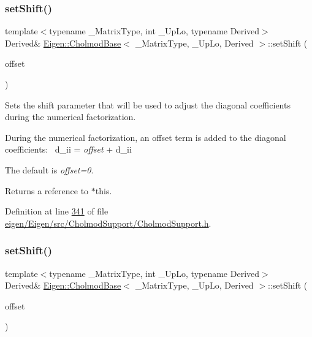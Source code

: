 \subsubsection{\texorpdfstring{set\+Shift()}{setShift()}\hspace{0.1cm}{\footnotesize\ttfamily [1/2]}}
{\footnotesize\ttfamily template$<$typename \+\_\+\+Matrix\+Type, int \+\_\+\+Up\+Lo, typename Derived$>$ \\
Derived\& \hyperlink{class_eigen_1_1_cholmod_base}{Eigen\+::\+Cholmod\+Base}$<$ \+\_\+\+Matrix\+Type, \+\_\+\+Up\+Lo, Derived $>$\+::set\+Shift (\begin{DoxyParamCaption}\item[{const Real\+Scalar \&}]{offset }\end{DoxyParamCaption})\hspace{0.3cm}{\ttfamily [inline]}}

Sets the shift parameter that will be used to adjust the diagonal coefficients during the numerical factorization.

During the numerical factorization, an offset term is added to the diagonal coefficients\+:~\newline
{\ttfamily d\+\_\+ii} = {\itshape offset} + {\ttfamily d\+\_\+ii} 

The default is {\itshape offset=0}.

\begin{DoxyReturn}{Returns}
a reference to {\ttfamily $\ast$this}. 
\end{DoxyReturn}


Definition at line \hyperlink{eigen_2_eigen_2src_2_cholmod_support_2_cholmod_support_8h_source_l00341}{341} of file \hyperlink{eigen_2_eigen_2src_2_cholmod_support_2_cholmod_support_8h_source}{eigen/\+Eigen/src/\+Cholmod\+Support/\+Cholmod\+Support.\+h}.

\mbox{\label{class_eigen_1_1_cholmod_base_a886fc102723ca7bde4ac7162dfd72f5d}} 
\subsubsection{\texorpdfstring{set\+Shift()}{setShift()}\hspace{0.1cm}{\footnotesize\ttfamily [2/2]}}
{\footnotesize\ttfamily template$<$typename \+\_\+\+Matrix\+Type, int \+\_\+\+Up\+Lo, typename Derived$>$ \\
Derived\& \hyperlink{class_eigen_1_1_cholmod_base}{Eigen\+::\+Cholmod\+Base}$<$ \+\_\+\+Matrix\+Type, \+\_\+\+Up\+Lo, Derived $>$\+::set\+Shift (\begin{DoxyParamCaption}\item[{const Real\+Scalar \&}]{offset }\end{DoxyParamCaption})\hspace{0.3cm}{\ttfamily [inline]}}

